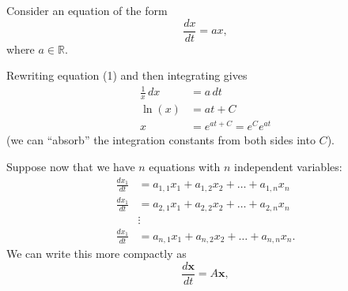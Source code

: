 \documentclass{res}
\newcommand{\bx}{\mathbf{x}}
\begin{document}
 


\address{       Shashank Singh\\
                86-712 Computational Neuroscience of Vision\\
                September 9, 2012
}
\address{}
\begin{resume}

Consider an equation of the form
\begin{equation}
\frac{dx}{dt} = a x,
\end{equation}
where $a \in \mathbb{R}$.

Rewriting equation (1) and then integrating gives
\begin{align*}
\frac1x \, dx & = a \, dt \\
\ln(x)        & = at + C \\
x             & = e^{at + C} = e^Ce^{at}
\end{align*}
(we can ``absorb'' the integration constants from both sides into $C$).

Suppose now that we have $n$ equations with $n$ independent variables:
\begin{align*}
\frac{dx_1}{dt} & = a_{1,1}x_1 + a_{1,2}x_2 + \ldots + a_{1,n}x_n \\
\frac{dx_1}{dt} & = a_{2,1}x_1 + a_{2,2}x_2 + \ldots + a_{2,n}x_n \\
                &                     \vdots                      \\
\frac{dx_1}{dt} & = a_{n,1}x_1 + a_{n,2}x_2 + \ldots + a_{n,n}x_n.
\end{align*}
We can write this more compactly as
\begin{equation}
\frac{d\bx}{dt} = A \bx,
\end{equation}


\end{resume}
\end{document}
